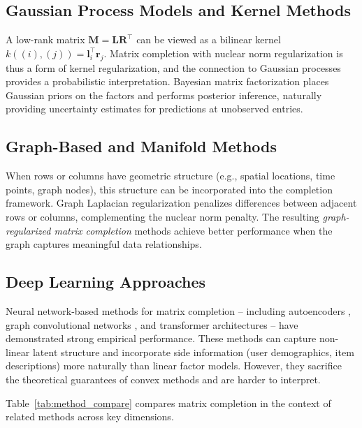 \documentclass[conference]{IEEEtran}
\begin{document}
\subsection{Gaussian Process Models and Kernel Methods}

A low-rank matrix $\mathbf{M} = \mathbf{L}\mathbf{R}^\top$ can be viewed as a bilinear kernel $k((i), (j)) = \mathbf{l}_i^\top \mathbf{r}_j$. Matrix completion with nuclear norm regularization is thus a form of kernel regularization, and the connection to Gaussian processes \cite{lawrence2009non} provides a probabilistic interpretation. Bayesian matrix factorization \cite{salakhutdinov2008bayesian} places Gaussian priors on the factors and performs posterior inference, naturally providing uncertainty estimates for predictions at unobserved entries.

\subsection{Graph-Based and Manifold Methods}

When rows or columns have geometric structure (e.g., spatial locations, time points, graph nodes), this structure can be incorporated into the completion framework. Graph Laplacian regularization penalizes differences between adjacent rows or columns, complementing the nuclear norm penalty. The resulting \emph{graph-regularized matrix completion} methods \cite{monti2017geometric} achieve better performance when the graph captures meaningful data relationships.

\subsection{Deep Learning Approaches}

Neural network-based methods for matrix completion -- including autoencoders \cite{sedhain2015autorec}, graph convolutional networks \cite{berg2017graph}, and transformer architectures -- have demonstrated strong empirical performance. These methods can capture non-linear latent structure and incorporate side information (user demographics, item descriptions) more naturally than linear factor models. However, they sacrifice the theoretical guarantees of convex methods and are harder to interpret.

Table~\ref{tab:method_compare} compares matrix completion in the context of related methods across key dimensions.
\end{document}

